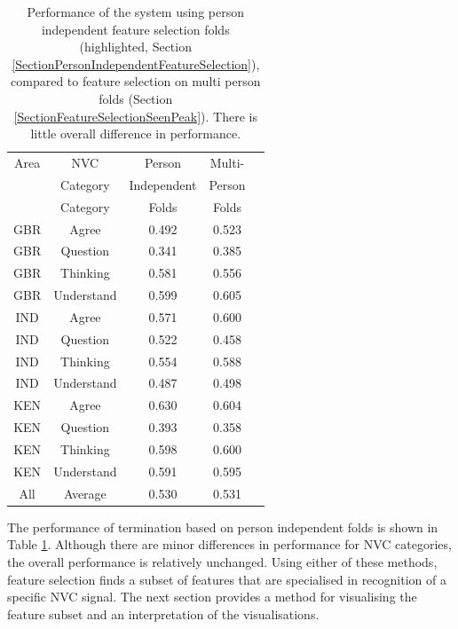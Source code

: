 \begin{table}[htb]
\centering
\caption[Performance of the system using person independent feature selection folds (highlighted, Section \ref{SectionPersonIndependentFeatureSelection}), compared to feature selection on multi person folds (Section \ref{SectionFeatureSelectionSeenPeak}).]{Performance of the system using person independent feature selection folds (highlighted, Section \ref{SectionPersonIndependentFeatureSelection}), compared to feature selection on multi person folds (Section \ref{SectionFeatureSelectionSeenPeak}). There is little overall difference in performance.}
\begin{tabular}{ | c | c | c | c | c | }
\hline
Area & NVC       & \cellcolor[gray]{0.8}Person      & Multi- \\
     & Category  & \cellcolor[gray]{0.8}Independent & Person \\
     & Category  & \cellcolor[gray]{0.8}Folds       & Folds \\
\hline
GBR & Agree      & \cellcolor[gray]{0.8}0.492 & 0.523\\
GBR & Question   & \cellcolor[gray]{0.8}0.341 & 0.385\\
GBR & Thinking   & \cellcolor[gray]{0.8}0.581 & 0.556\\
GBR & Understand & \cellcolor[gray]{0.8}0.599 & 0.605\\
\hline
IND & Agree      & \cellcolor[gray]{0.8}0.571 & 0.600\\
IND & Question   & \cellcolor[gray]{0.8}0.522 & 0.458\\
IND & Thinking   & \cellcolor[gray]{0.8}0.554 & 0.588\\
IND & Understand & \cellcolor[gray]{0.8}0.487 & 0.498\\
\hline
KEN & Agree      & \cellcolor[gray]{0.8}0.630 & 0.604\\
KEN & Question   & \cellcolor[gray]{0.8}0.393 & 0.358\\
KEN & Thinking   & \cellcolor[gray]{0.8}0.598 & 0.600\\
KEN & Understand & \cellcolor[gray]{0.8}0.591 & 0.595\\
\hline
All & Average    & \cellcolor[gray]{0.8}0.530 & 0.531\\
\hline
\end{tabular}
\label{TableFeatureSelectionPersonIndependent}
\end{table}

The performance of termination based on person independent folds is shown in Table \ref{TableFeatureSelectionPersonIndependent}. Although there are minor differences in performance for \ac{NVC} categories, the overall performance is relatively unchanged. Using either of these methods, feature selection finds a subset of features that are specialised in recognition of a specific \ac{NVC} signal. The next section provides a method for visualising the feature subset and an interpretation of the visualisations.

